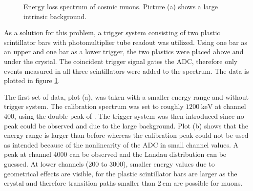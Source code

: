 \begin{figure}[b!]
	\centering
	\hfill
	\hfill
	\caption[Energy loss spectrum of cosmic muons]{Energy loss spectrum of cosmic muons. Picture (a) shows a large intrinsic background.}
	\label{fig:ch5:muon_spectrum}
\end{figure}
As a solution for this problem, a trigger system  consisting of two plastic scintillator bars with photomultiplier tube readout was utilized. Using one bar as an upper and one bar as a lower trigger, the two plastics were placed above and under the \pwo{} crystal. The coincident trigger signal gates the ADC, therefore only events measured in all three scintillators were added to the spectrum. The data is plotted in figure \ref{fig:ch5:muon_spectrum}. \par 
The first set of data, plot (a), was taken with a smaller energy range and without trigger system. The calibration spectrum was set to roughly $\SI{1200}{\keV}$ at channel 400, using the double peak of \co{}. The trigger system was then introduced since no peak could be observed and due to the large background. Plot (b) shows that the energy range is larger than before whereas the calibration peak could not be used as intended because of the nonlinearity of the ADC in small channel values. A peak at channel 4000 can be observed and the Landau distribution can be guessed. At lower channels (200 to 3000), smaller energy values due to geometrical effects are visible, for the plastic scintillator bars are larger as the \pwo{} crystal and therefore transition paths smaller than $\SI{2}{\centi\meter}$ are possible for muons.  






  



